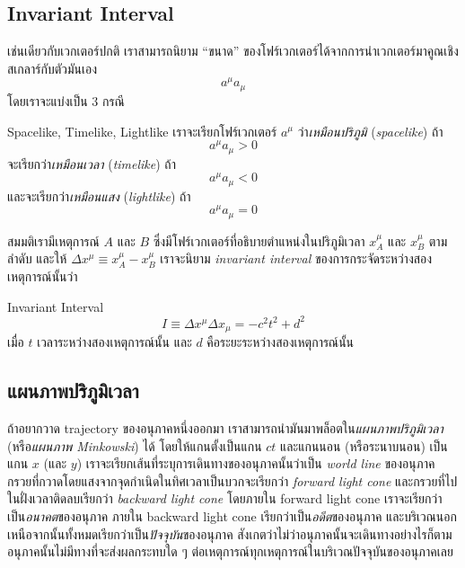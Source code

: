 \subsection{Invariant Interval}

เช่นเดียวกับเวกเตอร์ปกติ เราสามารถนิยาม ``ขนาด'' ของโฟร์เวกเตอร์ได้จากการนำเวกเตอร์มาคูณเชิงสเกลาร์กับตัวมันเอง
\[
a^\mu a_\mu
\]
โดยเราจะแบ่งเป็น $3$ กรณี
\begin{defbox}{ Spacelike, Timelike, Lightlike}
    เราจะเรียกโฟร์เวกเตอร์ $a^\mu$ ว่า\emph{เหมือนปริภูมิ} (\emph{spacelike}) ถ้า
    \[
    a^\mu a_\mu > 0
    \]
    จะเรียกว่า\emph{เหมือนเวลา} (\emph{timelike}) ถ้า
    \[
    a^\mu a_\mu < 0
    \]
    และจะเรียกว่า\emph{เหมือนแสง} (\emph{lightlike}) ถ้า
    \[
    a^\mu a_\mu = 0
    \]
\end{defbox}

สมมติเรามีเหตุการณ์ $A$ และ $B$ ซึ่งมีโฟร์เวกเตอร์ที่อธิบายตำแหน่งในปริภูมิเวลา $x_A^\mu$ และ $x_B^\mu$ ตามลำดับ และให้ $\Delta x^\mu \equiv x_A^\mu - x_B^\mu$ เราจะนิยาม \emph{invariant interval} ของการกระจัดระหว่างสองเหตุการณ์นั้นว่า
\begin{defbox}{ Invariant Interval}
    \begin{equation*}
        I \equiv \Delta x^\mu\Delta x_\mu = -c^2t^2 + d^2
    \end{equation*}
    เมื่อ $t$ เวลาระหว่างสองเหตุการณ์นั้น และ $d$ คือระยะระหว่างสองเหตุการณ์นั้น
\end{defbox}

\subsection{แผนภาพปริภูมิเวลา}

ถ้าอยากวาด trajectory ของอนุภาคหนึ่งออกมา เราสามารถนำมันมาพล็อตใน\emph{แผนภาพปริภูมิเวลา} (หรือ\emph{แผนภาพ Minkowski}) ได้ โดยให้แกนตั้งเป็นแกน $ct$ และแกนนอน (หรือระนาบนอน) เป็นแกน $x$ (และ $y$) เราจะเรียกเส้นที่ระบุการเดินทางของอนุภาคนั้นว่าเป็น \emph{world line} ของอนุภาค กรวยที่กวาดโดยแสงจากจุดกำเนิดในทิศเวลาเป็นบวกจะเรียกว่า \emph{forward light cone} และกรวยที่ไปในฝั่งเวลาติดลบเรียกว่า \emph{backward light cone} โดยภายใน forward light cone เราจะเรียกว่าเป็น\emph{อนาคต}ของอนุภาค ภายใน backward light cone เรียกว่าเป็น\emph{อดีต}ของอนุภาค และบริเวณนอกเหนือจากนั้นทั้งหมดเรียกว่าเป็น\emph{ปัจจุบัน}ของอนุภาค สังเกตว่าไม่ว่าอนุภาคนั้นจะเดินทางอย่างไรก็ตาม อนุภาคนั้นไม่มีทางที่จะส่งผลกระทบใด ๆ ต่อเหตุการณ์ทุกเหตุการณ์ในบริเวณปัจจุบันของอนุภาคเลย

